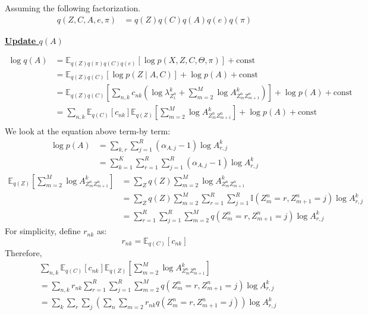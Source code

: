 \documentclass[12pt]{article}
\newenvironment{problem}[2][Problem]{\begin{trivlist}
\item[\hskip \labelsep {\bfseries #1}\hskip \labelsep {\bfseries #2.}]}{\end{trivlist}}
\begin{document}
\begin{problem}{2.8.24}
Assuming the following factorization.
\begin{align*}
    q(Z, C, A, e, \pi) &= q(Z)q(C)q(A)q(e)q(\pi)
\end{align*}


\begin{flushleft}
\textbf{\underline{Update $q(A)$}}
\end{flushleft}

\begin{align*}
    \log q(A) &= \mathbb{E}_{q(Z)q(\pi)q(C)q(e)}[\log p(X, Z, C, \Theta, \pi)] + \text{const} \\
    &= \mathbb{E}_{q(Z)q(C)}[\log p(Z\mid A, C)] + \log p(A)+ \text{const} \\
    &= \mathbb{E}_{q(Z)q(C)}[\sum_{n,k}c_{nk}(\log\lambda^k_{Z^n_{1}} + \sum_{m=2}^{M}\log A^k_{Z^n_{m}Z^n_{m+1}})] 
        + \log p(A)+ \text{const} \\
    &= \sum_{n,k}\mathbb{E}_{q(C)}[c_{nk}]\mathbb{E}_{q(Z)}[\sum_{m=2}^{M}\log A^k_{Z^n_{m}Z^n_{m+1}}] 
        + \log p(A)+ \text{const} \\
\end{align*}
We look at the equation above term-by term:
\begin{align*}
    \log p(A) &= \sum_{k,r}\sum_{j=1}^{R} (\alpha_{A,j} - 1)\log A^k_{r,j} \\
    &= \sum_{k=1}^{K}\sum_{r=1}^{R}\sum_{j=1}^{R} (\alpha_{A,j} - 1)\log A^k_{r,j}
\end{align*}
\begin{align*}
    \mathbb{E}_{q(Z)}[\sum_{m=2}^{M}\log A^k_{Z^n_{m}Z^n_{m+1}}] &=
    \sum_{Z}q(Z)\sum_{m=2}^{M}\log A^k_{Z^n_{m}Z^n_{m+1}} \\
    &= \sum_{Z}q(Z)\sum_{m=2}^{M}\sum_{r=1}^{R}\sum_{j=1}^{R}\mathbb{I}(Z^n_{m}=r, Z^n_{m+1}=j)\log A^k_{r,j} \\
    &= \sum_{r=1}^{R}\sum_{j=1}^{R}\sum_{m=2}^{M}q(Z^n_{m}=r, Z^n_{m+1}=j)\log A^k_{r,j}
\end{align*}
For simplicity, define $r_{nk}$ as:
\begin{equation}
    r_{nk} = \mathbb{E}_{q(C)}[c_{nk}] 
\end{equation}
Therefore,
\begin{align*}
    &\sum_{n,k}\mathbb{E}_{q(C)}[c_{nk}]\mathbb{E}_{q(Z)}[\sum_{m=2}^{M}\log A^k_{Z^n_{m}Z^n_{m+1}}] \\
    &= \sum_{n,k} r_{nk} \sum_{r=1}^{R}\sum_{j=1}^{R}\sum_{m=2}^{M}q(Z^n_{m}=r, Z^n_{m+1}=j)\log A^k_{r,j} \\
    &= \sum_{k}\sum_{r}\sum_{j}(\sum_{n}\sum_{m=2}r_{nk} q(Z^n_{m}=r, Z^n_{m+1}=j))\log A^k_{r,j}

\end{align*}
\end{problem}
\end{document}
